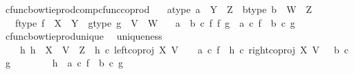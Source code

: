 \begin{isabellebody}
\endisatagproof
{\isafoldproof}%
%
\isadelimproof
\isanewline
%
\endisadelimproof
\isanewline
{}\isamarkupfalse%
\ cfunc{\isacharunderscore}{\kern0pt}bowtieprod{\isacharunderscore}{\kern0pt}comp{\isacharunderscore}{\kern0pt}cfunc{\isacharunderscore}{\kern0pt}coprod{\isacharcolon}{\kern0pt}\isanewline
\ \ \ a{\isacharunderscore}{\kern0pt}type{\isacharcolon}{\kern0pt}\ {\isachardoublequoteopen}a\ {\isacharcolon}{\kern0pt}\ Y\ {\isasymrightarrow}\ Z{\isachardoublequoteclose}\ \ b{\isacharunderscore}{\kern0pt}type{\isacharcolon}{\kern0pt}\ {\isachardoublequoteopen}b\ {\isacharcolon}{\kern0pt}\ W\ {\isasymrightarrow}\ Z{\isachardoublequoteclose}\isanewline
\ \ \ f{\isacharunderscore}{\kern0pt}type{\isacharcolon}{\kern0pt}\ {\isachardoublequoteopen}f\ {\isacharcolon}{\kern0pt}\ X\ {\isasymrightarrow}\ Y{\isachardoublequoteclose}\ \ g{\isacharunderscore}{\kern0pt}type{\isacharcolon}{\kern0pt}\ {\isachardoublequoteopen}g\ {\isacharcolon}{\kern0pt}\ V\ {\isasymrightarrow}\ W{\isachardoublequoteclose}\isanewline
\ \ \ {\isachardoublequoteopen}{\isacharparenleft}{\kern0pt}a\ {\isasymamalg}\ b{\isacharparenright}{\kern0pt}\ {\isasymcirc}\isactrlsub c\ {\isacharparenleft}{\kern0pt}f\ {\isasymbowtie}\isactrlsub f\ g{\isacharparenright}{\kern0pt}\ {\isacharequal}{\kern0pt}\ {\isacharparenleft}{\kern0pt}a\ {\isasymcirc}\isactrlsub c\ f{\isacharparenright}{\kern0pt}\ {\isasymamalg}\ {\isacharparenleft}{\kern0pt}b\ {\isasymcirc}\isactrlsub c\ g{\isacharparenright}{\kern0pt}{\isachardoublequoteclose}\isanewline
%
\isadelimproof
%
\endisadelimproof
%
\isatagproof
{}\isamarkupfalse%
\ {\isacharminus}{\kern0pt}\ \isanewline
\ \ \isamarkupfalse%
\ cfunc{\isacharunderscore}{\kern0pt}bowtie{\isacharunderscore}{\kern0pt}prod{\isacharunderscore}{\kern0pt}unique\ \isamarkupfalse%
\ uniqueness{\isacharcolon}{\kern0pt}\isanewline
\ \ \ \ {\isachardoublequoteopen}{\isasymforall}h{\isachardot}{\kern0pt}\ h\ {\isacharcolon}{\kern0pt}\ X\ {\isasymCoprod}\ V\ {\isasymrightarrow}\ Z\ {\isasymand}\ h\ {\isasymcirc}\isactrlsub c\ left{\isacharunderscore}{\kern0pt}coproj\ X\ V\ \ \ {\isacharequal}{\kern0pt}\ a\ {\isasymcirc}\isactrlsub c\ f\ {\isasymand}\ h\ {\isasymcirc}\isactrlsub c\ right{\isacharunderscore}{\kern0pt}coproj\ X\ V\ \ {\isacharequal}{\kern0pt}\ b\ {\isasymcirc}\isactrlsub c\ g\ {\isasymlongrightarrow}\ \isanewline
\ \ \ \ \ \ h\ {\isacharequal}{\kern0pt}\ {\isacharparenleft}{\kern0pt}a\ {\isasymcirc}\isactrlsub c\ f{\isacharparenright}{\kern0pt}\ {\isasymamalg}\ {\isacharparenleft}{\kern0pt}b\ {\isasymcirc}\isactrlsub c\ g{\isacharparenright}{\kern0pt}{\isachardoublequoteclose}\isanewline

\end{isabellebody}
